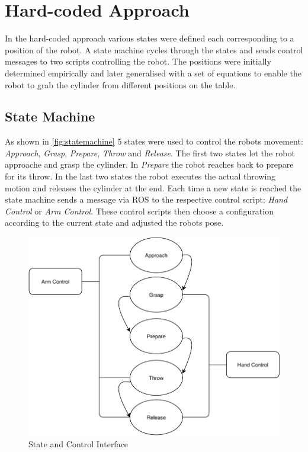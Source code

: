 \section{Hard-coded Approach}
\label{sec:hard-coded}
In the hard-coded approach various states were defined each corresponding to a position of the robot.
A state machine cycles through the states and sends control messages to two scripts controlling the robot.
The positions were initially determined empirically and later generalised with a set of equations to enable the robot to grab the cylinder from different positions on the table.

\subsection{State Machine}
As shown in \autoref{fig:statemachine} 5 states were used to control the robots movement: \textit{Approach}, \textit{Grasp}, \textit{Prepare}, \textit{Throw} and \textit{Release}.
The first two states let the robot approache and grasp the cylinder.
In \textit{Prepare} the robot reaches back to prepare for its throw.
In the last two states the robot executes the actual throwing motion and releases the cylinder at the end.
Each time a new state is reached the state machine sends a message via ROS to the respective control script: \textit{Hand Control} or \textit{Arm Control}.
These control scripts then choose a configuration according to the current state and adjusted the robots pose.

\begin{figure}[tpb]
\centering
	\includegraphics[width=0.96\linewidth]{figures/state.pdf} 
	\caption{State and Control Interface}
	\vspace{-0.4cm}
	\label{fig:statemachine}
\end{figure}



